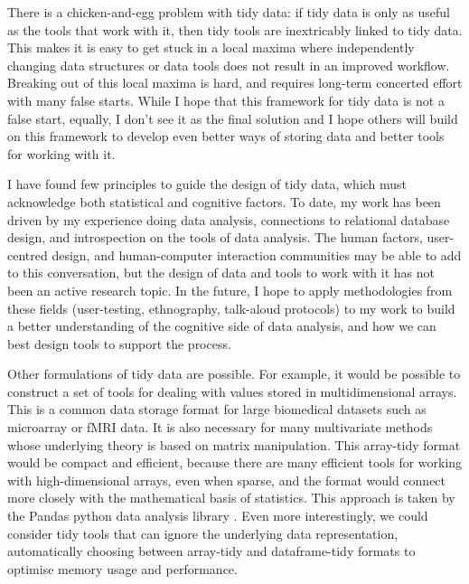 \documentclass[article]{jss}
\begin{document}
There is a chicken-and-egg problem with tidy data: if tidy data is only as useful as the tools that work with it, then tidy tools are inextricably linked to tidy data. This makes it is easy to get stuck in a local maxima where independently changing data structures or data tools does not result in an improved workflow. Breaking out of this local maxima is hard, and requires long-term concerted effort with many false starts. While I hope that this framework for tidy data is not a false start, equally, I don't see it as the final solution and I hope others will build on this framework to develop even better ways of storing data and better tools for working with it.

I have found few principles to guide the design of tidy data, which must acknowledge both statistical and cognitive factors. To date, my work has been driven by my experience doing data analysis, connections to relational database design, and introspection on the tools of data analysis. The human factors, user-centred design, and human-computer interaction communities may be able to add to this conversation, but the design of data and tools to work with it has not been an active research topic. In the future, I hope to apply methodologies from these fields (user-testing, ethnography, talk-aloud protocols) to my work to build a better understanding of the cognitive side of data analysis, and how we can best design tools to support the process.


Other formulations of tidy data are possible. For example, it would be possible to construct a set of tools for dealing with values stored in multidimensional arrays. This is a common data storage format for large biomedical datasets such as microarray or fMRI data. It is also necessary for many multivariate methods whose underlying theory is based on matrix manipulation. This array-tidy format would be compact and efficient, because there are many efficient tools for working with high-dimensional arrays, even when sparse, and the format would connect more closely with the mathematical basis of statistics. This approach is taken by the Pandas python data analysis library \citep{mckinney:2010}. Even more interestingly, we could consider tidy tools that can ignore the underlying data representation, automatically choosing between array-tidy and dataframe-tidy formats to optimise memory usage and performance.
\end{document}
